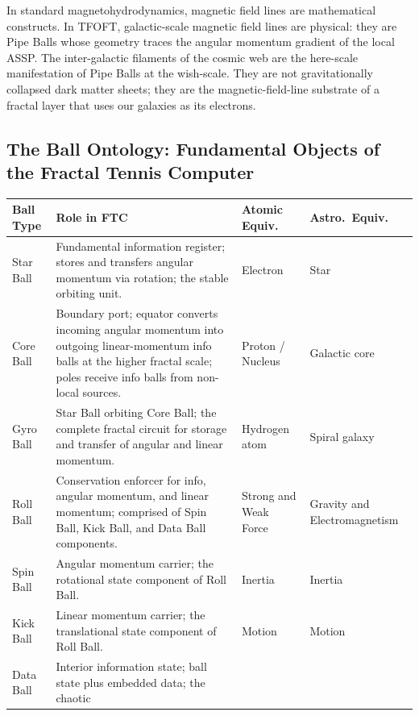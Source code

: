 \documentclass[11pt,a4paper]{article}
\begin{document}
In standard magnetohydrodynamics, magnetic field lines are mathematical constructs.
In TFOFT, galactic-scale magnetic field lines are physical: they are Pipe Balls
whose geometry traces the angular momentum gradient of the local ASSP. The
inter-galactic filaments of the cosmic web are the here-scale manifestation of Pipe
Balls at the wish-scale. They are not gravitationally collapsed dark matter sheets;
they are the magnetic-field-line substrate of a fractal layer that uses our galaxies
as its electrons.

\subsection{The Ball Ontology: Fundamental Objects of the Fractal Tennis Computer}

\begin{table}[h]
\centering
\begin{tabular}{|l|p{4.5cm}|p{2cm}|p{2.5cm}|}
\hline
\textbf{Ball Type} & \textbf{Role in FTC} & \textbf{Atomic Equiv.} & \textbf{Astro.\ Equiv.} \\
\hline
Star Ball  & Fundamental information register; stores and transfers angular
             momentum via rotation; the stable orbiting unit.
           & Electron & Star \\
\hline
Core Ball  & Boundary port; equator converts incoming angular momentum into
             outgoing linear-momentum info balls at the higher fractal scale;
             poles receive info balls from non-local sources.
           & Proton / Nucleus & Galactic core \\
\hline
Gyro Ball  & Star Ball orbiting Core Ball; the complete fractal circuit for
             storage and transfer of angular and linear momentum.
           & Hydrogen atom & Spiral galaxy \\
\hline
Roll Ball  & Conservation enforcer for info, angular momentum, and linear
             momentum; comprised of Spin Ball, Kick Ball, and Data Ball
             components.
           & Strong and Weak Force & Gravity and Electromagnetism \\
\hline
Spin Ball  & Angular momentum carrier; the rotational state component of Roll Ball.
           & Inertia & Inertia \\
\hline
Kick Ball  & Linear momentum carrier; the translational state component of Roll Ball.
           & Motion & Motion \\
\hline
Data Ball  & Interior information state; ball state plus embedded data; the chaotic

\end{tabular}
\end{table}
\end{document}
